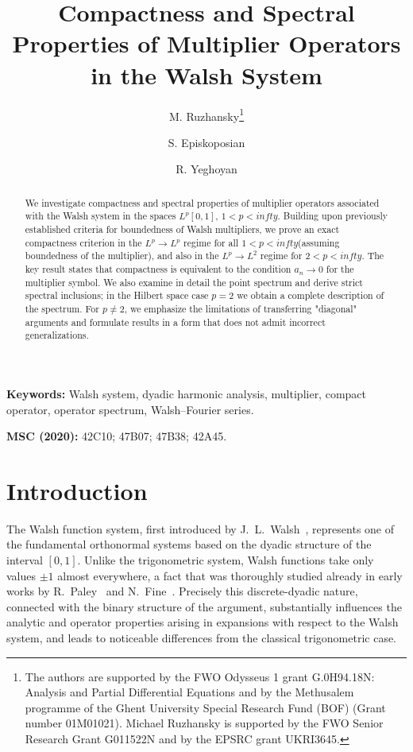 \documentclass[a4paper,12pt]{article}
\title{\textbf{Compactness and Spectral Properties of Multiplier Operators in the Walsh System}}
\author{M. Ruzhansky\thanks{The authors are supported by the FWO Odysseus 1 grant G.0H94.18N: Analysis and Partial Differential Equations and by the Methusalem programme of the Ghent University Special Research Fund (BOF) (Grant number 01M01021). Michael Ruzhansky is supported by the FWO Senior Research Grant G011522N and by the EPSRC grant UKRI3645.}
 \and S. Episkoposian\footnotemark[1] \and R. Yeghoyan\footnotemark[1]}
\date{}
\theoremstyle{definition}
\theoremstyle{remark}
\theoremstyle{definition}
\newcommand{\Lp}{L^p[0,1]}
\def\infty{infty}%
\begin{document}
\maketitle

\begin{abstract}
We investigate compactness and spectral properties of multiplier operators associated with the Walsh system in the spaces $\Lp$, $1<p<\infty$.
Building upon previously established criteria for boundedness of Walsh multipliers, we prove an exact compactness criterion in the $L^p\to L^p$ regime for all $1<p<\infty$(assuming boundedness of the multiplier), and also in the $L^p\to L^2$ regime for $2<p<\infty$.
The key result states that compactness is equivalent to the condition $a_n\to 0$ for the multiplier symbol.
We also examine in detail the point spectrum and derive strict spectral inclusions; in the Hilbert space case $p=2$ we obtain a complete description of the spectrum.
For $p\neq 2$, we emphasize the limitations of transferring "diagonal" arguments and formulate results in a form that does not admit incorrect generalizations.
\end{abstract}

\medskip
\noindent\textbf{Keywords:} Walsh system, dyadic harmonic analysis, multiplier, compact operator, operator spectrum, Walsh–Fourier series.

\medskip
\noindent\textbf{MSC (2020):} 42C10; 47B07; 47B38; 42A45.

\section{Introduction}
\label{sec:intro}

The Walsh function system, first introduced by J.~L.~Walsh~\cite{Walsh1923},
represents one of the fundamental orthonormal systems
based on the dyadic structure of the interval $[0,1]$.
Unlike the trigonometric system,
Walsh functions take only values $\pm1$ almost everywhere,
a fact that was thoroughly studied already in early works by R.~Paley~\cite{Paley1932}
and N.~Fine~\cite{Fine1949}.
Precisely this discrete-dyadic nature,
connected with the binary structure of the argument,
substantially influences the analytic and operator properties
arising in expansions with respect to the Walsh system,
and leads to noticeable differences from the classical trigonometric case.
\end{document}
